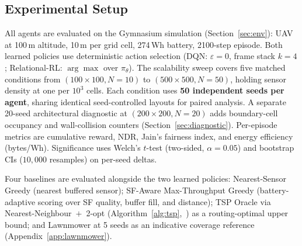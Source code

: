 \subsection{Experimental Setup}
\label{sec:exp_setup}

All agents are evaluated on the Gymnasium simulation
(Section~\ref{sec:env}): UAV at 100\,m altitude, 10\,m per grid cell,
274\,Wh battery, 2100-step episode. Both learned policies use
deterministic action selection (DQN: $\varepsilon{=}0$, frame stack
$k{=}4$; Relational-RL: $\arg\max$ over $\pi_\theta$). The scalability
sweep covers five matched conditions from $(100{\times}100, N{=}10)$ to
$(500{\times}500, N{=}50)$, holding sensor density at one per
$10^3$ cells. Each condition uses \textbf{50 independent seeds per
agent}, sharing identical seed-controlled layouts for paired analysis.
A separate 20-seed architectural diagnostic at $(200{\times}200,
N{=}20)$ adds boundary-cell occupancy and wall-collision counters
(Section~\ref{sec:diagnostic}). Per-episode metrics are cumulative
reward, NDR, Jain's fairness index, and energy efficiency (bytes/Wh).
Significance uses Welch's $t$-test (two-sided, $\alpha{=}0.05$) and
bootstrap CIs ($10{,}000$ resamples) on per-seed deltas.

Four baselines are evaluated alongside the two learned policies:
Nearest-Sensor Greedy (nearest buffered sensor); SF-Aware
Max-Throughput Greedy (battery-adaptive scoring over SF quality, buffer
fill, and distance); TSP Oracle via Nearest-Neighbour~$+$~2-opt
(Algorithm~\ref{alg:tsp},~\cite{lin1973effective}) as a routing-optimal
upper bound; and Lawnmower at 5 seeds as an indicative coverage
reference (Appendix~\ref{app:lawnmower}).
